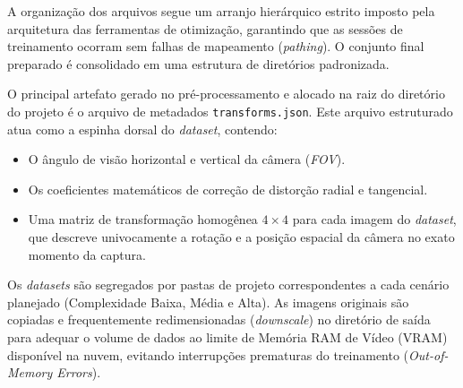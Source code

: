 A organização dos arquivos segue um arranjo hierárquico estrito imposto pela arquitetura das ferramentas de otimização, garantindo que as sessões de treinamento ocorram sem falhas de mapeamento (\textit{pathing}). O conjunto final preparado é consolidado em uma estrutura de diretórios padronizada.

O principal artefato gerado no pré-processamento e alocado na raiz do diretório do projeto é o arquivo de metadados \texttt{transforms.json}. Este arquivo estruturado atua como a espinha dorsal do \textit{dataset}, contendo:

\begin{itemize}
    \item O ângulo de visão horizontal e vertical da câmera (\textit{FOV}).
    \item Os coeficientes matemáticos de correção de distorção radial e tangencial.
    \item Uma matriz de transformação homogênea $4 \times 4$ para cada imagem do \textit{dataset}, que descreve univocamente a rotação e a posição espacial da câmera no exato momento da captura.
\end{itemize}

Os \textit{datasets} são segregados por pastas de projeto correspondentes a cada cenário planejado (Complexidade Baixa, Média e Alta). As imagens originais são copiadas e frequentemente redimensionadas (\textit{downscale}) no diretório de saída para adequar o volume de dados ao limite de Memória RAM de Vídeo (VRAM) disponível na nuvem, evitando interrupções prematuras do treinamento (\textit{Out-of-Memory Errors}).
